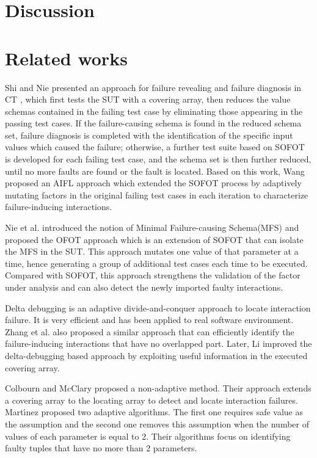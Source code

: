 {\section{Discussion}\label{sec:discussion}


\section{Related works}\label{sec:related}
Shi and Nie \cite{shi2005software} presented an approach for failure revealing and failure diagnosis in CT , which first tests the SUT with a covering array, then reduces the value schemas contained in the failing test case by eliminating those appearing in the passing test cases. If the failure-causing schema is found in the reduced schema set, failure diagnosis is completed with the identification of the specific input values which caused the failure; otherwise, a further test suite based on SOFOT is developed for each failing test case, and the schema set is then further reduced, until no more faults are found or the fault is located. Based on this work, Wang \cite{wang2010adaptive} proposed an AIFL approach which extended the SOFOT process by adaptively mutating factors in the original failing test cases in each iteration to characterize failure-inducing interactions.

Nie et al. \cite{nie2011minimal} introduced the notion of Minimal Failure-causing Schema(MFS) and proposed the OFOT approach which is an extension of SOFOT that can isolate the MFS in the SUT. This approach mutates one value of that parameter at a time, hence generating a group of additional test cases each time to be executed. Compared with SOFOT, this approach  strengthens the validation of the factor under analysis and can also detect the newly imported faulty interactions.

Delta debugging \cite{zeller2002simplifying} is an adaptive divide-and-conquer approach to locate interaction failure. It is very efficient and has been applied to real software environment. Zhang et al. \cite{zhang2011characterizing} also proposed a similar approach that can efficiently identify the failure-inducing interactions that have no overlapped part. Later, Li \cite{li2012improved} improved the delta-debugging based approach by exploiting useful information in the executed covering array.

Colbourn and McClary \cite{colbourn2008locating} proposed a non-adaptive method. Their approach extends a covering array to the locating array to detect and locate interaction failures. Mart{\'\i}nez \cite{martinez2008algorithms,martinez2009locating} proposed two adaptive algorithms. The first one requires safe value as the assumption and the second one removes this assumption when the number of values of each parameter is equal to 2. Their algorithms focus on identifying faulty tuples that have no more than 2 parameters.

}
